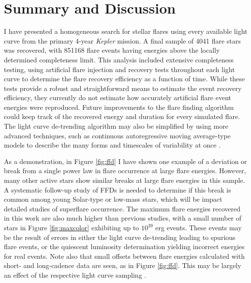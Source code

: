 \documentclass[twocolumn]{aastex6}
\newcommand{\Kepler}{\textsl{Kepler}\xspace}
\begin{document}
\section{Summary and Discussion}

I have presented a homogeneous search for stellar flares using every available light curve from the primary 4-year \Kepler mission. A final sample of 4041 flare stars was recovered, with 851168 flare events having energies above the locally determined completeness limit.
This analysis included extensive completeness testing, using artificial flare injection and recovery tests throughout each light curve to determine the flare recovery efficiency as a function of time.  
While these tests provide a robust and straightforward means to estimate the event recovery efficiency, they currently do not estimate how accurately artificial flare event energies were reproduced. Future improvements to the flare finding algorithm could keep track of the recovered energy and duration for every simulated flare. The light curve de-trending algorithm may also be simplified by using more advanced techniques, such as continuous autoregressive moving average-type models to describe the many forms and timescales of variability at once \citep[e.g.][]{kelly2014}.

As a demonstration, in Figure \ref{fig:ffd} I have shown one example of a deviation or break from a single power law in flare occurrence at large flare energies. However, many other active stars show similar breaks at large flare energies in this sample. A systematic follow-up study of FFDs is needed to determine if this break is common among young Solar-type or low-mass stars, which will be impact detailed studies of superflare occurrence. 
The maximum flare energies recovered in this work are also much higher than previous studies, with a small number of stars in Figure \ref{fig:maxcolor} exhibiting up to $10^{39}$ erg events. These events may be the result of errors in either the light curve de-trending leading to spurious flare events, or the quiescent luminosity determination yielding incorrect energies for real events.
 Note also that small offsets between flare energies calculated with short- and long-cadence data are seen, as in Figure \ref{fig:ffd}. This may be largely an effect of the respective light curve sampling \citep[e.g. see][]{maehara2015}.
\end{document}
